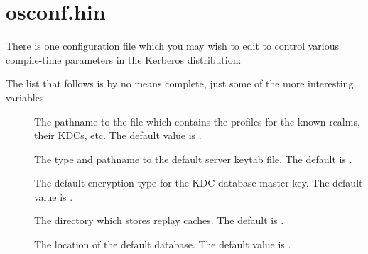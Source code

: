 \documentclass[letterpaper,10pt,english]{sphinxmanual}
\begin{document}
\section{osconf.hin}
\label{\detokenize{build/osconf:osconf-hin}}\label{\detokenize{build/osconf::doc}}
There is one configuration file which you may wish to edit to control
various compile-time parameters in the Kerberos distribution:

%
\begin{sphinxVerbatim}[commandchars=\\\{\}]
\end{sphinxVerbatim}

The list that follows is by no means complete, just some of the more
interesting variables.
\begin{description}
\item[{}] \leavevmode
The pathname to the file which contains the profiles for the known
realms, their KDCs, etc. The default value is .

\item[{}] \leavevmode
The type and pathname to the default server keytab file.  The
default is .

\item[{}] \leavevmode
The default encryption type for the KDC database master key.  The
default value is .

\item[{}] \leavevmode
The directory which stores replay caches.  The default is
.

\item[{}] \leavevmode
The location of the default database.  The default value is
.

\end{description}



\renewcommand{\indexname}{Index}
\printindex
\end{document}
